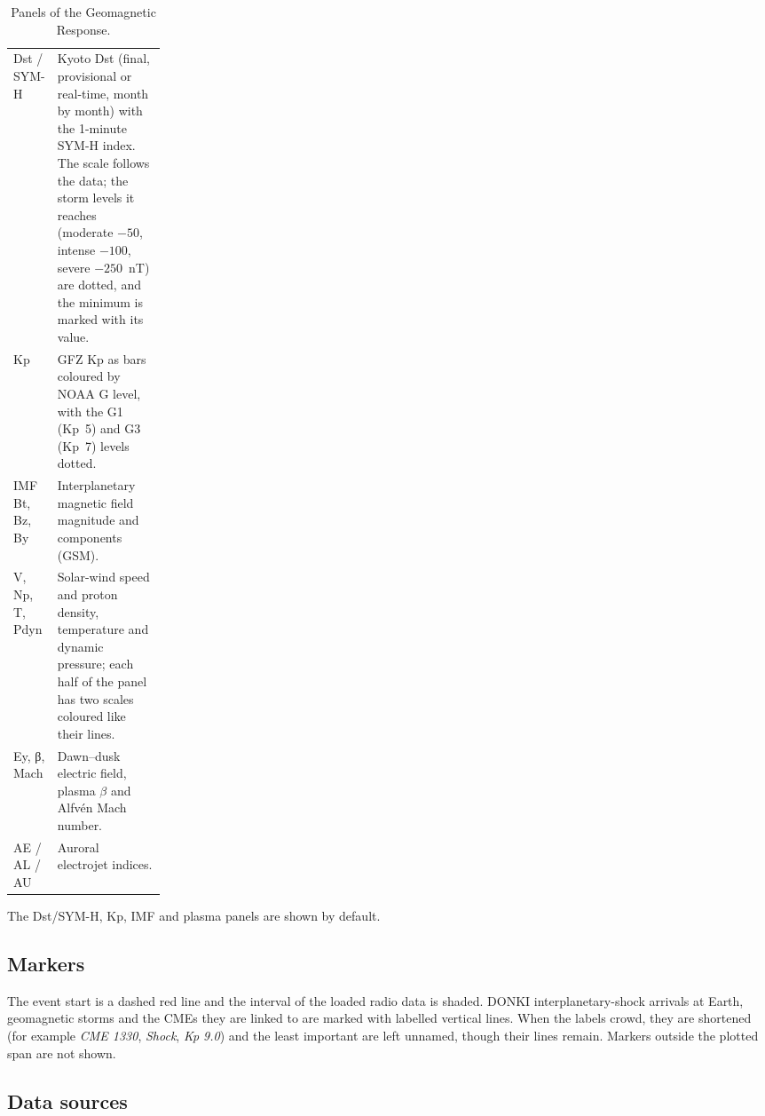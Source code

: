 \begin{table}[!htbp]
  \centering
  \caption{Panels of the Geomagnetic Response.}
  \label{tab:geo-panels}
  \small
  \begin{tabularx}{\linewidth}{@{}P{0.2\linewidth}L@{}}
    \toprule
     &  \\
    \midrule
    Dst / SYM-H & Kyoto Dst (final, provisional or real-time, month by month) with the 1-minute SYM-H index. The scale follows the data; the storm levels it reaches (moderate \(-50\), intense \(-100\), severe \(-250\)~nT) are dotted, and the minimum is marked with its value. \\
    Kp & GFZ Kp as bars coloured by NOAA G level, with the G1 (Kp~5) and G3 (Kp~7) levels dotted. \\
    IMF Bt, Bz, By & Interplanetary magnetic field magnitude and components (GSM). \\
    V, Np, T, Pdyn & Solar-wind speed and proton density, temperature and dynamic pressure; each half of the panel has two scales coloured like their lines. \\
    Ey, β, Mach & Dawn--dusk electric field, plasma \(\beta\) and Alfvén Mach number. \\
    AE / AL / AU & Auroral electrojet indices. \\
    \bottomrule
  \end{tabularx}
\end{table}
The Dst/SYM-H, Kp, IMF and plasma panels are shown by default.

\subsection{Markers}

The event start is a dashed red line and the interval of the loaded radio data is shaded.
DONKI interplanetary-shock arrivals at Earth, geomagnetic storms and the CMEs they are linked
to are marked with labelled vertical lines. When the labels crowd, they are shortened (for
example \emph{CME 1330}, \emph{Shock}, \emph{Kp 9.0}) and the least important are left unnamed,
though their lines remain. Markers outside the plotted span are not shown.

\subsection{Data sources}

